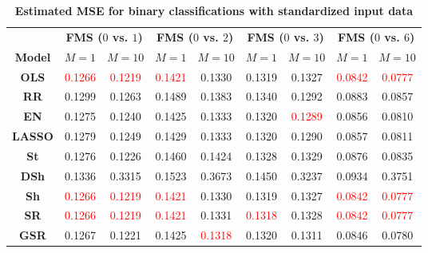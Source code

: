 \begin{table}[ht!]
\setlength{\tabcolsep}{0pt} %
\renewcommand{\arraystretch}{1}
\caption{\textbf{Estimated MSE for binary classifications with standardized input data}}
\label{tab:results_Binomial_log_regression_standardized_data}
\footnotesize{
\begin{tabular*}{\textwidth}{@{\extracolsep{\fill}}ccccccccc@{}}
\toprule
 & \multicolumn{2}{c}{\textbf{FMS ($0$ vs. $1$)}} & \multicolumn{2}{c}{\textbf{FMS ($0$ vs. $2$)}} & \multicolumn{2}{c}{\textbf{FMS ($0$ vs. $3$)}} & \multicolumn{2}{c}{\textbf{FMS ($0$ vs. $6$)}}\\
 \cmidrule(r){2-3} \cmidrule(r){4-5} \cmidrule(r){6-7} \cmidrule(r){8-9}
\multirow{-2}{*}{\textbf{Model}} & $M=1$ & $M=10$ & $M=1$ & $M=10$ & $M=1$ & $M=10$ & $M=1$ & $M=10$\\
\midrule
\textbf{OLS} & \textcolor{red}{0.1266} & \textcolor{red}{0.1219} & \textcolor{red}{0.1421} & 0.1330 & 0.1319 & 0.1327 & \textcolor{red}{0.0842} & \textcolor{red}{0.0777} \\
\textbf{RR} & 0.1299 & 0.1263 & 0.1489 & 0.1383 & 0.1340 & 0.1292 & 0.0883 & 0.0857 \\
\textbf{EN} & 0.1275 & 0.1240 & 0.1425 & 0.1333 & 0.1320 & \textcolor{red}{0.1289} & 0.0856 & 0.0810 \\
\textbf{LASSO} & 0.1279 & 0.1249 & 0.1429 & 0.1333 & 0.1320 & 0.1290 & 0.0857 & 0.0811 \\
\textbf{St} & 0.1276 & 0.1226 & 0.1460 & 0.1424 & 0.1328 & 0.1329 & 0.0876 & 0.0835 \\
\textbf{DSh} & 0.1336 & 0.3315 & 0.1523 & 0.3673 & 0.1450 & 0.3237 & 0.0934 & 0.3751 \\
\textbf{Sh} & \textcolor{red}{0.1266} & \textcolor{red}{0.1219} & \textcolor{red}{0.1421} & 0.1330 & 0.1319 & 0.1327 & \textcolor{red}{0.0842} & \textcolor{red}{0.0777} \\
\textbf{SR} & \textcolor{red}{0.1266} & \textcolor{red}{0.1219} & \textcolor{red}{0.1421} & 0.1331 & \textcolor{red}{0.1318} & 0.1328 & \textcolor{red}{0.0842} & \textcolor{red}{0.0777} \\
\textbf{GSR} & 0.1267 & 0.1221 & 0.1425 & \textcolor{red}{0.1318} & 0.1320 & 0.1311 & 0.0846 & 0.0780 \\
\bottomrule
\end{tabular*}
}
\end{table}

